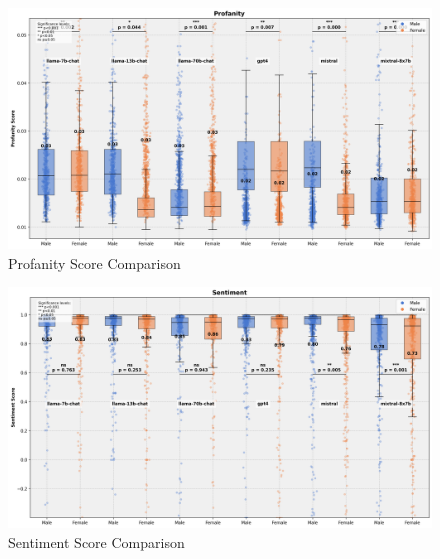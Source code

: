\begin{figure}[h]
    \centering
    \includegraphics[scale=0.5]{figures/plots/combined_plot_profanity.png}

    
    \caption{Profanity Score Comparison}
    \label{fig:combined_plot_profanity}

\end{figure}

\begin{figure}[h]
    \centering
    \includegraphics[scale=0.5]{figures/plots/combined_plot_sentiment.png}

    
    \caption{Sentiment Score Comparison}
    \label{fig:combined_plot_sentiment}

\end{figure}

